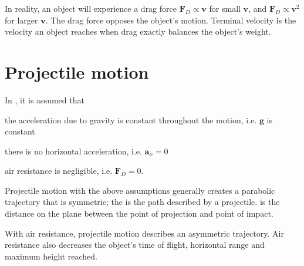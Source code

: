 \documentclass[Physics.tex]{subfiles}
\begin{document}
In reality, an object will experience a drag force \(\mathbf{F}_D \propto \mathbf{v}\) for small \(\mathbf{v}\), and \(\mathbf{F}_D \propto \mathbf{v}^2\) for larger \(\mathbf{v}\). The drag force opposes the object's motion. Terminal velocity is the velocity an object reaches when drag exactly balances the object's weight.
\section{Projectile motion}
In , it is assumed that
\begin{slinenum}
\item the acceleration due to gravity is constant throughout the motion, i.e. \(\mathbf{g}\) is constant
\item there is no horizontal acceleration, i.e. \(\mathbf{a}_x = 0\)
\item air resistance is negligible, i.e. \(\mathbf{F}_D = 0\).
\end{slinenum}
Projectile motion with the above assumptions generally creates a parabolic trajectory that is symmetric; the  is the path described by a projectile.  is the distance on the plane between the point of projection and point of impact.

With air resistance, projectile motion describes an asymmetric trajectory. Air resistance also decreases the object's time of flight, horizontal range and maximum height reached.
\end{document}
